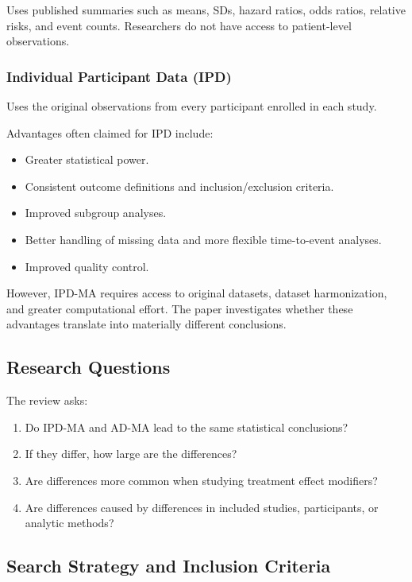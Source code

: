 \documentclass[11pt]{article}
\begin{document}
Uses published summaries such as means, SDs, hazard ratios, odds ratios, relative risks, and event counts. Researchers do not have access to patient-level observations.

\subsubsection*{Individual Participant Data (IPD)}

Uses the original observations from every participant enrolled in each study.

Advantages often claimed for IPD include:

\begin{itemize}
    \item Greater statistical power.
    \item Consistent outcome definitions and inclusion/exclusion criteria.
    \item Improved subgroup analyses.
    \item Better handling of missing data and more flexible time-to-event analyses.
    \item Improved quality control.
\end{itemize}

However, IPD-MA requires access to original datasets, dataset harmonization, and greater computational effort. The paper investigates whether these advantages translate into materially different conclusions.

\subsection*{Research Questions}

The review asks:

\begin{enumerate}
    \item Do IPD-MA and AD-MA lead to the same statistical conclusions?
    \item If they differ, how large are the differences?
    \item Are differences more common when studying treatment effect modifiers?
    \item Are differences caused by differences in included studies, participants, or analytic methods?
\end{enumerate}

\subsection*{Search Strategy and Inclusion Criteria}
\end{document}
